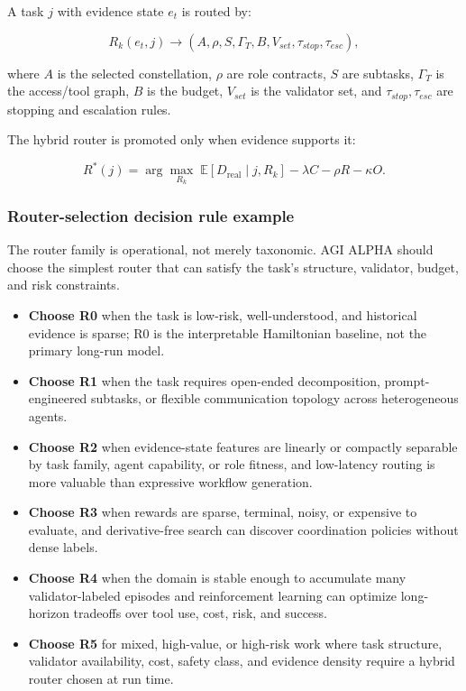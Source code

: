 \documentclass[11pt]{article}
\providecommand{\tightlist}{\setlength{\itemsep}{0pt}\setlength{\parskip}{0pt}}
\begin{document}
A task \(j\) with evidence state \(e_t\) is routed by:

\[
R_k(e_t,j)\rightarrow(A,\rho,S,\Gamma_T,B,V_{set},\tau_{stop},\tau_{esc}),
\]

where \(A\) is the selected constellation, \(\rho\) are role contracts,
\(S\) are subtasks, \(\Gamma_T\) is the access/tool graph, \(B\) is the
budget, \(V_{set}\) is the validator set, and \(\tau_{stop},\tau_{esc}\)
are stopping and escalation rules.

The hybrid router is promoted only when evidence supports it:

\[
R^*(j)=\arg\max_{R_k}\;\mathbb{E}[D_{\mathrm{real}}\mid j,R_k]-\lambda C-\rho R-\kappa O.
\]

\subsubsection{Router-selection decision rule
example}\label{router-selection-decision-rule-example}

The router family is operational, not merely taxonomic. AGI ALPHA
should choose the simplest router that can satisfy the task's structure,
validator, budget, and risk constraints.

\begin{itemize}
\tightlist
\item
  \textbf{Choose R0} when the task is low-risk, well-understood, and
  historical evidence is sparse; R0 is the interpretable Hamiltonian
  baseline, not the primary long-run model.
\item
  \textbf{Choose R1} when the task requires open-ended decomposition,
  prompt-engineered subtasks, or flexible communication topology across
  heterogeneous agents.
\item
  \textbf{Choose R2} when evidence-state features are linearly or
  compactly separable by task family, agent capability, or role fitness,
  and low-latency routing is more valuable than expressive workflow
  generation.
\item
  \textbf{Choose R3} when rewards are sparse, terminal, noisy, or
  expensive to evaluate, and derivative-free search can discover
  coordination policies without dense labels.
\item
  \textbf{Choose R4} when the domain is stable enough to accumulate many
  validator-labeled episodes and reinforcement learning can optimize
  long-horizon tradeoffs over tool use, cost, risk, and success.
\item
  \textbf{Choose R5} for mixed, high-value, or high-risk work where task
  structure, validator availability, cost, safety class, and evidence
  density require a hybrid router chosen at run time.
\end{itemize}
\end{document}
